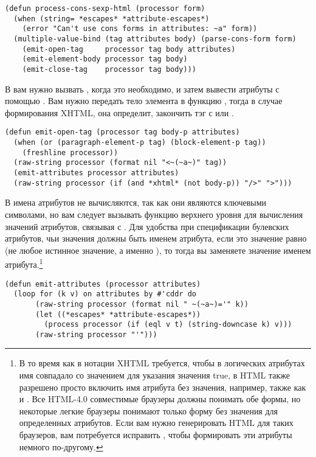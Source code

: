 \begin{lstlisting}
(defun process-cons-sexp-html (processor form)
  (when (string= *escapes* *attribute-escapes*)
    (error "Can't use cons forms in attributes: ~a" form))
  (multiple-value-bind (tag attributes body) (parse-cons-form form)
    (emit-open-tag     processor tag body attributes)
    (emit-element-body processor tag body)
    (emit-close-tag    processor tag body)))
\end{lstlisting}

В  вам нужно вызвать , когда это необходимо, и затем
вывести атрибуты с помощью . Вам нужно передать тело элемента в
функцию , тогда в случае формирования XHTML, она определит, закончить
тэг с \code{/>} или \code{>}.

\begin{lstlisting}
(defun emit-open-tag (processor tag body-p attributes)
  (when (or (paragraph-element-p tag) (block-element-p tag))
    (freshline processor))
  (raw-string processor (format nil "<~(~a~)" tag))
  (emit-attributes processor attributes)
  (raw-string processor (if (and *xhtml* (not body-p)) "/>" ">")))
\end{lstlisting}

В  имена атрибутов не вычисляются, так как они являются ключевыми
символами, но вам следует вызывать функцию  верхнего уровня для вычисления
значений атрибутов, связывая  с . Для удобства
при спецификации булевских атрибутов, чьи значения должны быть именем атрибута, если это
значение равно  (не любое истинное значение, а именно ), то тогда вы
заменяете значение именем атрибута.\footnote{В то время как в нотации XHTML требуется,
  чтобы в логических атрибутах имя совпадало со значением для указания значения true, в
  HTML также разрешено просто включить имя атрибута без значения, например,  также как и . Все HTML-4.0 совместимые
  браузеры должны понимать обе формы, но некоторые легкие браузеры понимают только форму
  без значения для определенных атрибутов. Если вам нужно генерировать HTML для таких
  браузеров, вам потребуется исправить , чтобы формировать эти
  атрибуты немного по-другому.}

\begin{lstlisting}
(defun emit-attributes (processor attributes)
  (loop for (k v) on attributes by #'cddr do
       (raw-string processor (format nil " ~(~a~)='" k))
       (let ((*escapes* *attribute-escapes*))
         (process processor (if (eql v t) (string-downcase k) v)))
       (raw-string processor "'")))
\end{lstlisting}


